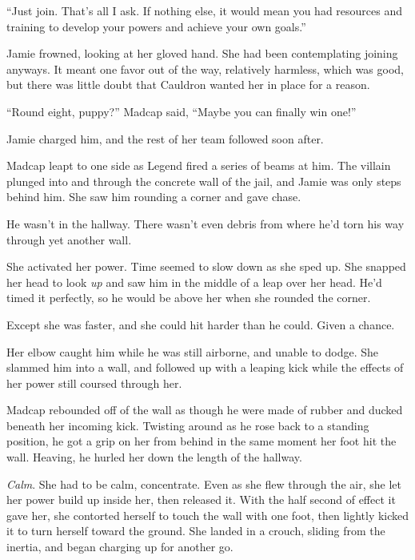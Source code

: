``Just join.  That's all I ask.  If nothing else, it would mean you had resources and training to develop your powers and achieve your own goals.''



Jamie frowned, looking at her gloved hand.  She had been contemplating joining anyways.  It meant one favor out of the way, relatively harmless, which was good, but there was little doubt that Cauldron wanted her in place for a reason.



\sectionbreak



``Round eight, puppy?''  Madcap said, ``Maybe you can finally win one!''



Jamie charged him, and the rest of her team followed soon after.



Madcap leapt to one side as Legend fired a series of beams at him.  The villain plunged into and through the concrete wall of the jail, and Jamie was only steps behind him.  She saw him rounding a corner and gave chase.



He wasn't in the hallway.  There wasn't even debris from where he'd torn his way through yet another wall.



She activated her power.  Time seemed to slow down as she sped up.  She snapped her head to look \emph{up} and saw him in the middle of a leap over her head.  He'd timed it perfectly, so he would be above her when she rounded the corner.



Except she was faster, and she could hit harder than he could.  Given a chance.



Her elbow caught him while he was still airborne, and unable to dodge.  She slammed him into a wall, and followed up with a leaping kick while the effects of her power still coursed through her.



Madcap rebounded off of the wall as though he were made of rubber and ducked beneath her incoming kick.  Twisting around as he rose back to a standing position, he got a grip on her from behind in the same moment her foot hit the wall.  Heaving, he hurled her down the length of the hallway.



\emph{Calm}.  She had to be calm, concentrate.  Even as she flew through the air, she let her power build up inside her, then released it.  With the half second of effect it gave her, she contorted herself to touch the wall with one foot, then lightly kicked it to turn herself toward the ground.  She landed in a crouch, sliding from the inertia, and began charging up for another go.



